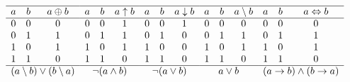 \documentclass[12pt]{article}
\begin{document}
    \begin{table}[H]
        \centering
        \hfill
        $\begin{array}{c c c}
            \hline
            a & b & a \oplus b\\
            \hline
            0 & 0 & 0\\
            0 & 1 & 1\\
            1 & 0 & 1\\
            1 & 1 & 0\\
            \hline
            \multicolumn{3}{c}{(a \setminus b) \lor (b \setminus a)}
        \end{array}
        \hfill
        \begin{array}{c c c}
            \hline
            a & b & a \uparrow b\\
            \hline
            0 & 0 & 1\\
            0 & 1 & 1\\
            1 & 0 & 1\\
            1 & 1 & 0\\
            \hline
            \multicolumn{3}{c}{\lnot (a \land b)}
        \end{array}
        \hfill
        \begin{array}{c c c}
            \hline
            a & b & a \downarrow b\\
            \hline
            0 & 0 & 1\\
            0 & 1 & 0\\
            1 & 0 & 0\\
            1 & 1 & 0\\
            \hline
            \multicolumn{3}{c}{\lnot (a \lor b)}
        \end{array}
        \hfill
        \begin{array}{c c c}
            \hline
            a & b & a \setminus b\\
            \hline
            0 & 0 & 0\\
            0 & 1 & 1\\
            1 & 0 & 1\\
            1 & 1 & 0\\
            \hline
            \multicolumn{3}{c}{a \lor b}
        \end{array}
        \hfill
        \begin{array}{c c c}
            \hline
            a & b & a \Leftrightarrow b\\
            \hline
            0 & 0 & 0\\
            0 & 1 & 1\\
            1 & 0 & 1\\
            1 & 1 & 0\\
            \hline
            \multicolumn{3}{c}{(a \to b) \land (b \to a)}
        \end{array}$
        \hfill
        \captionsetup{position=bottom}
        \caption{Tables de vérités et formules équivalentes.}\label{tab:tab-verite} 
    \end{table}
\end{document}
